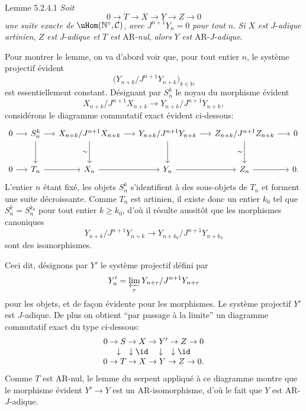 \begin{statement}{Lemme 5.2.4.1}
\emph{Soit}
\[
0\longrightarrow T\longrightarrow X\longrightarrow Y\longrightarrow Z\longrightarrow0
\]
\emph{une suite exacte de} \(\uHom(\mathbb{N}^\circ,\mathcal{C})\), \emph{avec} \(J^{n+1}Y_n=0\) \emph{pour tout} \(n\). \emph{Si} \(X\) \emph{est} \(J\)-\emph{adique artinien}, \(Z\) \emph{est} \(J\)-\emph{adique et} \(T\) \emph{est} AR-\emph{nul}, \emph{alors} \(Y\) \emph{est} AR-\(J\)-\emph{adique}.
\end{statement}

Pour montrer le lemme, on va d'abord voir que, pour tout entier \(n\), le système projectif évident
\[
\bigl(Y_{n+k}/J^{n+1}Y_{n+k}\bigr)_{k\in\mathbb{N}}
\]
est essentiellement constant. Désignant par \(S_n^k\) le noyau du morphisme évident
\[
X_{n+k}/J^{n+1}X_{n+k}\longrightarrow
Y_{n+k}/J^{n+1}Y_{n+k},
\]
considérons le diagramme commutatif exact évident ci-dessous:
\[
\begin{tikzcd}[column sep=1.35em,row sep=large]
0 \arrow[r] & S_n^k \arrow[r] \arrow[d] & X_{n+k}/J^{n+1}X_{n+k} \arrow[r] \arrow[d,"\sim"'] & Y_{n+k}/J^{n+1}Y_{n+k} \arrow[r] \arrow[d] & Z_{n+k}/J^{n+1}Z_{n+k} \arrow[r] \arrow[d,"\sim"'] & 0\\
0 \arrow[r] & T_n \arrow[r] & X_n \arrow[r] & Y_n \arrow[r] & Z_n \arrow[r] & 0 .
\end{tikzcd}
\]
L'entier \(n\) étant fixé, les objets \(S_n^k\) s'identifient à des sous-objets de \(T_n\) et forment une suite décroissante. Comme \(T_n\) est artinien, il existe donc un entier \(k_0\) tel que \(S_n^k=S_n^{k_0}\) pour tout entier \(k\ge k_0\), d'où il résulte aussitôt que les morphismes canoniques
\[
Y_{n+k}/J^{n+1}Y_{n+k}
\longrightarrow
Y_{n+k_0}/J^{n+1}Y_{n+k_0}
\]
sont des isomorphismes.

Ceci dit, désignons par \(Y'\) le système projectif défini par
\[
Y'_n=\varprojlim_r Y_{n+r}/J^{n+1}Y_{n+r}
\]
pour les objets, et de façon évidente pour les morphismes. Le système projectif \(Y'\) est \(J\)-adique. De plus on obtient ``par passage à la limite'' un diagramme commutatif exact du type ci-dessous:
\[
\begin{array}{ccccc}
0\to S\to X\to Y'\to Z\to0\\
\downarrow\quad\downarrow\id\quad\downarrow\quad\downarrow\id\\
0\to T\to X\to Y\to Z\to0 .
\end{array}
\]
Comme \(T\) est AR-nul, le lemme du serpent appliqué à ce diagramme montre que le morphisme évident \(Y'\to Y\) est un AR-isomorphisme, d'où le fait que \(Y\) est AR-\(J\)-adique.

